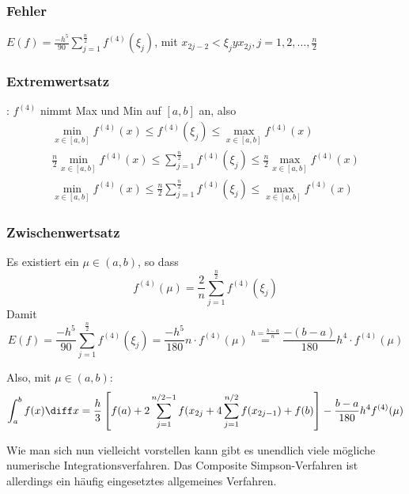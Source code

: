 \subsubsection{Fehler} $E(f) = \frac{-h^5}{90}\sum_{j=1}^{\frac{n}{2}}f^{(4)}(\xi_j)$, mit $x_{2j-2} < \xi_j y x_{2j}, j=1,2,\ldots,\frac{n}{2}$

\subsubsection{Extremwertsatz}: $f^{(4)}$ nimmt Max und Min auf $[a,b]$ an, also
\begin{equation}
\begin{split}
\min\limits_{x\in[a,b]}f^{(4)}(x) \leq f^{(4)}(\xi_j) \leq \max\limits_{x\in[a,b]}f^{(4)}(x)\\
\frac{n}{2}\min\limits_{x\in[a,b]}f^{(4)}(x) \leq \sum_{j=1}^{\frac{n}{2}}f^{(4)}(\xi_j) \leq \frac{n}{2}\max\limits_{x\in[a,b]}f^{(4)}(x)\\
\min\limits_{x\in[a,b]}f^{(4)}(x) \leq \frac{n}{2}\sum_{j=1}^{\frac{n}{2}}f^{(4)}(\xi_j) \leq \max\limits_{x\in[a,b]}f^{(4)}(x)
\end{split}
\end{equation}

\subsubsection{Zwischenwertsatz} Es existiert ein $\mu\in(a,b)$, so dass
\begin{equation}
f^{(4)}(\mu) = \frac{2}{n}\sum_{j=1}^{\frac{n}{2}}f^{(4)}(\xi_j)
\end{equation}
Damit
\begin{equation}
E(f) = \frac{-h^5}{90}\sum_{j=1}^{\frac{n}{2}}f^{(4)}(\xi_j) = \frac{-h^5}{180}n\cdot f^{(4)}(\mu) \overset{h=\frac{b-a}{n}}{=} \frac{-(b-a)}{180}h^4\cdot f^{(4)}(\mu)
\end{equation}

Also, mit $\mu \in (a, b)$:
\begin{equation}
	\int_a^b f(x) \diff x = \frac{h}{3} \left[ f(a) + 2 \sum_{j = 1}^{n/2 - 1} f(x_{2j} + 4 \sum_{j = 1}^{n/2} f(x_{2j - 1}) + f(b) \right] - \frac{b - a}{180} h^4 f^{(4)}(\mu)
\end{equation}

Wie man sich nun vielleicht vorstellen kann gibt es unendlich viele mögliche numerische Integrationsverfahren. Das Composite Simpson-Verfahren ist allerdings ein häufig eingesetztes allgemeines Verfahren.

